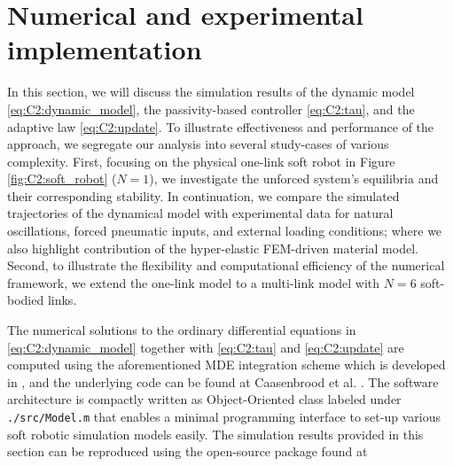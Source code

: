 \section{Numerical and experimental implementation}
\noindent In this section, we will discuss the simulation results of the dynamic model \eqref{eq:C2:dynamic_model}, the passivity-based controller \eqref{eq:C2:tau}, and the adaptive law \eqref{eq:C2:update}. To illustrate effectiveness and performance of the approach, we segregate our analysis into several study-cases of various complexity. First, focusing on the physical one-link soft robot in Figure \ref{fig:C2:soft_robot} ($N = 1$), we investigate the unforced system's equilibria and their corresponding stability. In continuation, we compare the simulated trajectories of the dynamical model with experimental data for natural oscillations, forced pneumatic inputs, and external loading conditions; where we also highlight contribution of the hyper-elastic FEM-driven material model. Second, to illustrate the flexibility and computational efficiency of the numerical framework, we extend the one-link model to a multi-link model with $N = 6$ soft-bodied links.

The numerical solutions to the ordinary differential equations in \eqref{eq:C2:dynamic_model} together with \eqref{eq:C2:tau} and \eqref{eq:C2:update} are computed using the aforementioned MDE integration scheme which is developed in \matlab, and the underlying code can be found at Caasenbrood et al. \cite{Caasenbrood2021}. The software architecture is compactly written as Object-Oriented class labeled under \texttt{./src/Model.m} that enables a minimal programming interface to set-up various soft robotic simulation models easily. 
The simulation results provided in this section can be reproduced using the open-source \sorotoki package found at \cite{SorotokiCode}
%

